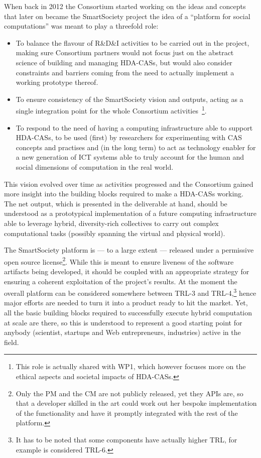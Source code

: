 When back in 2012 the Consortium started working on the ideas and concepts that later on became the SmartSociety project the idea of a ``platform for social computations'' was meant to play a threefold role:
\begin{itemize}
\item To balance the flavour of R\&D\&I activities to be carried out in the project, making sure Consortium partners would not focus just on the abstract science of building and managing HDA-CASs, but would also consider constraints and barriers coming from the need to actually implement a working prototype thereof.
\item To ensure consistency of the SmartSociety vision and outputs, acting as a single integration point for the whole Consortium activities~\footnote{This role is actually shared with WP1, which however focuses more on the ethical aspects and societal impacts of HDA-CASs.}.
\item To respond to the need of having a computing infrastructure able to support HDA-CASs, to be used (first) by researchers for experimenting with CAS concepts and practises and (in the long term) to act as technology enabler for a new generation of ICT systems able to truly account for the human and social dimensions of computation in the real world.
\end{itemize}  

This vision evolved over time as activities progressed and the Consortium gained more insight into the building blocks required to make a HDA-CASs working. The net output, which is presented in the deliverable at hand, should be understood as a prototypical implementation of a future computing infrastructure able to leverage hybrid, diversity-rich collectives to carry out complex computational tasks (possibly spanning the virtual and physical world).

The SmartSociety platform is --- to a large extent --- released under a permissive open source license\footnote{Only the PM and the CM are not publicly released, yet they APIs are, so that a developer skilled in the art could work out her bespoke implementation of the functionality and have it promptly integrated with the rest of the platform.}. While this is meant to ensure liveness of the software artifacts being developed, it should be coupled with an appropriate strategy for ensuring a coherent exploitation of the project's results. At the moment the overall platform can be considered somewhere between TRL-3 and TRL-4,\footnote{It has to be noted that some components have actually higher TRL, for example \mdl is considered TRL-6.} hence major efforts are needed to turn it into a product ready to hit the market. Yet, all the basic building blocks required to successfully execute hybrid computation at scale are there, so this is understood to represent a good starting point for anybody (scientist, startups and Web entrepreneurs, industries) active in the field.

